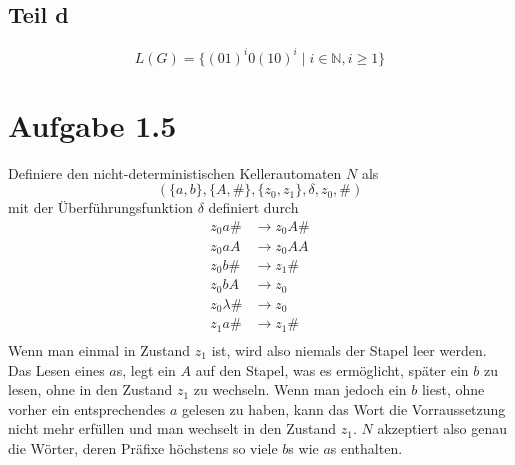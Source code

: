 \documentclass[10pt,a4paper]{article}
\begin{document}
\subsection{Teil d}

\begin{equation}
  L(G) = \{ (01)^{i}0(10)^{i} \mid i \in \mathbb{N}, i \ge 1 \}
\end{equation}

\section{Aufgabe 1.5}

Definiere den nicht-deterministischen Kellerautomaten $N$ als
\begin{equation}
  (\{ a, b \}, \{ A, \# \}, \{ z_{0}, z_{1} \}, \delta, z_{0}, \#)
\end{equation}
mit der Überführungsfunktion $\delta$ definiert durch
\begin{align*}
  z_{0}a\# & \rightarrow z_{0}A\#\\
  z_{0}aA & \rightarrow z_{0}AA\\
  z_{0}b\# & \rightarrow z_{1}\#\\
  z_{0}bA & \rightarrow z_{0}\\
  z_{0}\lambda\# & \rightarrow z_{0}\\
  z_{1}a\# & \rightarrow z_{1}\#\\
\end{align*}
Wenn man einmal in Zustand $z_{1}$ ist, wird also niemals der Stapel leer werden.
Das Lesen eines $a$s, legt ein $A$ auf den Stapel, was es ermöglicht, später ein $b$ zu lesen, ohne in den Zustand $z_{1}$ zu wechseln.
Wenn man jedoch ein $b$ liest, ohne vorher ein entsprechendes $a$ gelesen zu haben, kann das Wort die Vorraussetzung nicht mehr erfüllen und man wechselt in den Zustand $z_{1}$.
$N$ akzeptiert also genau die Wörter, deren Präfixe höchstens so viele $b$s wie $a$s enthalten.
\end{document}
